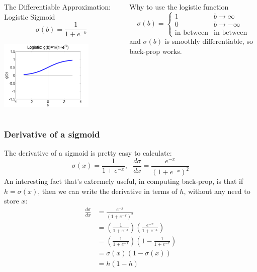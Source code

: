 \documentclass{beamer}
\begin{document}
\begin{frame}
  \begin{columns}[t]
    \column{2.25in}
    \begin{block}{The Differentiable Approximation: Logistic Sigmoid}
      \[
      \sigma(b)=\frac{1}{1+e^{-b}}
      \]
      \centerline{\includegraphics[width=1.75in]{figs/nn_logistic.png}}
    \end{block}
    \column{2.25in}
    \begin{block}{Why to use the logistic function}
      \[
      \sigma(b) = \begin{cases}
        1 & b\rightarrow\infty\\
        0 & b\rightarrow -\infty\\
        \mbox{in between} & \mbox{in between}
      \end{cases}
      \]
      and $\sigma(b)$ is smoothly differentiable, so
      back-prop works.
    \end{block}
  \end{columns}
\end{frame}

\begin{frame}
  \frametitle{Derivative of a sigmoid}
  The derivative of a sigmoid is pretty easy to calculate:
  \[
  \sigma(x)=\frac{1}{1+e^{-x}},~~~\frac{d\sigma}{dx}=\frac{e^{-x}}{(1+e^{-x})^2}
  \]
  An interesting fact that's extremely useful, in computing back-prop,
  is that if $h=\sigma(x)$, then we can write the derivative in terms
  of $h$, without any need to store $x$:
  \begin{align*}
    \frac{d\sigma}{dx} &=\frac{e^{-x}}{(1+e^{-x})^2}\\
    &=\left(\frac{1}{1+e^{-x}}\right)\left(\frac{e^{-x}}{1+e^{-x}}\right)\\
    &=\left(\frac{1}{1+e^{-x}}\right)\left(1-\frac{1}{1+e^{-x}}\right)\\
    &=\sigma(x)(1-\sigma(x))\\
    &=h(1-h)\\
  \end{align*}
\end{frame}
\end{document}
